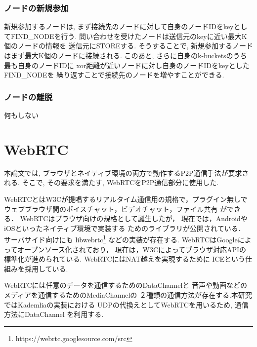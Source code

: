 \documentclass[sotsuron]{jcsie}
\begin{document}
\subsubsection{ノードの新規参加}
新規参加するノードは, 
まず接続先のノードに対して自身のノードIDをkeyとしてFIND\_NODEを行う.
問い合わせを受けたノードは送信元のkeyに近い最大K個のノードの情報を
送信元にSTOREする.
そうすることで, 新規参加するノードはまず最大K個のノードに接続される.
このあと, さらに自身のk-bucketsのうち最も自身のノードIDに
xor距離が近いノードに対し自身のノードIDをkeyとしたFIND\_NODEを
繰り返すことで接続先のノードを増やすことができる.
\subsubsection{ノードの離脱}
何もしない

\section{WebRTC}
本論文では, 
ブラウザとネイティブ環境の両方で動作するP2P通信手法が要求される.
そこで, その要求を満たす, WebRTCをP2P通信部分に使用した.

WebRTCとはW3Cが提唱するリアルタイム通信用の規格で，プラグイン無しで
ウェブブラウザ間のボイスチャット，ビデオチャット，ファイル共有
ができる．
WebRTCはブラウザ向けの規格として誕生したが，
現在では，AndroidやiOSといったネイティブ環境で実装する
ためのライブラリが公開されている．
サーバサイド向けにも
libwebrtc\footnote{https://webrtc.googlesource.com/src}
などの実装が存在する.
WebRTCはGoogleによってオープンソース化されており，
現在は，W3Cによってブラウザ対応APIの標準化が進められている.
WebRTCにはNAT越えを実現するために
ICE\cite{rosenberg2010interactive}という仕組みを採用している.

WebRTCには任意のデータを通信するためのDataChannelと
音声や動画などのメディアを通信するためのMediaChannelの
２種類の通信方法が存在する.本研究ではKademliaの実装における
UDPの代換えとしてWebRTCを用いるため, 通信方法にDataChannel
を利用する.
\end{document}
